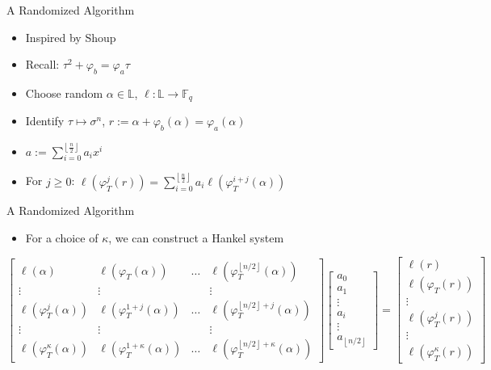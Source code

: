 \documentclass{beamer}
\newcommand{\f}{\mathbb{F}}
\begin{document}
\begin{frame}{A Randomized Algorithm}

\begin{itemize}
    \item Inspired by Shoup  
    \item Recall: $\tau^2 + \varphi_b = \varphi_a \tau$
    \item Choose random $\alpha \in \mathbb{L}$, $\ell : \mathbb{L} \to \f_q$
    \item Identify $\tau \mapsto \sigma^n$, $r := \alpha + \varphi_b(\alpha) = \varphi_a(\alpha)$
    \item $a := \sum_{i=0}^{\left\lfloor \frac{n}{2} \right\rfloor}a_ix^i$
    \item For $j \geq 0$: $\ell(\varphi_T^j(r)) = \sum_{i = 0}^{\left\lfloor{\frac{n}{2}} \right\rfloor}a_i\ell(\varphi_T^{i+j}(\alpha))$
    \end{itemize}
    
    \end{frame}
    
    \begin{frame}{A Randomized Algorithm}
    \begin{itemize}
    \item For a choice of $\kappa$, we can construct a Hankel system
\end{itemize}
\[ \begin{bmatrix}\ell(\alpha) & \ell(\varphi_T(\alpha)) & \ldots & \ell(\varphi_T^{\left\lfloor n/2 \right\rfloor}(\alpha)) \\ \vdots & \vdots & & \vdots \\ 

\ell(\varphi_T^{j}(\alpha)) & \ell(\varphi_T^{1+j}(\alpha)) & \ldots & \ell(\varphi_T^{\left\lfloor n/2 \right\rfloor+j}(\alpha)) \\ \vdots & \vdots & & \vdots \\

\ell(\varphi_T^{\kappa}(\alpha)) & \ell(\varphi_T^{1 + \kappa }(\alpha)) & \ldots & \ell(\varphi_T^{\left\lfloor n/2 \right\rfloor + \kappa}(\alpha))

\end{bmatrix} \begin{bmatrix} a_0 \\ a_1 \\ \vdots \\ a_i \\ \vdots \\ a_{\left\lfloor n/2 \right\rfloor} \end{bmatrix} = \begin{bmatrix} \ell(r) \\ \ell(\varphi_T(r)) \\ \vdots \\ \ell(\varphi_T^j(r)) \\ \vdots  \\   \ell(\varphi_T^{\kappa}(r)) \end{bmatrix} \]
    
\end{frame}
\end{document}
